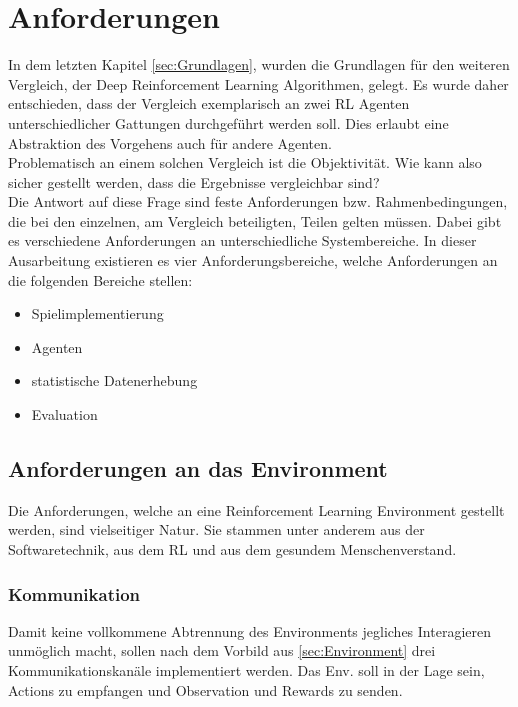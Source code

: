 \chapter{Anforderungen}
In dem letzten Kapitel \ref{sec:Grundlagen}, wurden die Grundlagen für den weiteren Vergleich, der Deep Reinforcement Learning Algorithmen, gelegt. Es wurde daher entschieden, dass der Vergleich exemplarisch an zwei RL Agenten unterschiedlicher Gattungen durchgeführt werden soll. Dies erlaubt eine Abstraktion des Vorgehens auch für andere Agenten.\\
Problematisch an einem solchen Vergleich ist die Objektivität. Wie kann also sicher gestellt werden, dass die Ergebnisse vergleichbar sind?\\
Die Antwort auf diese Frage sind feste Anforderungen bzw. Rahmenbedingungen, die bei den einzelnen, am Vergleich beteiligten, Teilen gelten müssen. Dabei gibt es verschiedene Anforderungen an unterschiedliche Systembereiche. In dieser Ausarbeitung existieren es vier Anforderungsbereiche, welche Anforderungen an die folgenden Bereiche stellen:
\begin{itemize}
	\item Spielimplementierung
	\item Agenten
	\item statistische Datenerhebung
	\item Evaluation
\end{itemize}

\section{Anforderungen an das Environment}
Die Anforderungen, welche an eine Reinforcement Learning Environment gestellt werden, sind vielseitiger Natur. Sie stammen unter anderem aus der Softwaretechnik, aus dem RL und aus dem gesundem Menschenverstand.

\subsection{Kommunikation}
Damit keine vollkommene Abtrennung des Environments jegliches Interagieren unmöglich macht, sollen nach dem Vorbild aus \ref{sec:Environment} drei Kommunikationskanäle implementiert werden. Das Env. soll in der Lage sein, Actions zu empfangen und Observation und Rewards zu senden.

